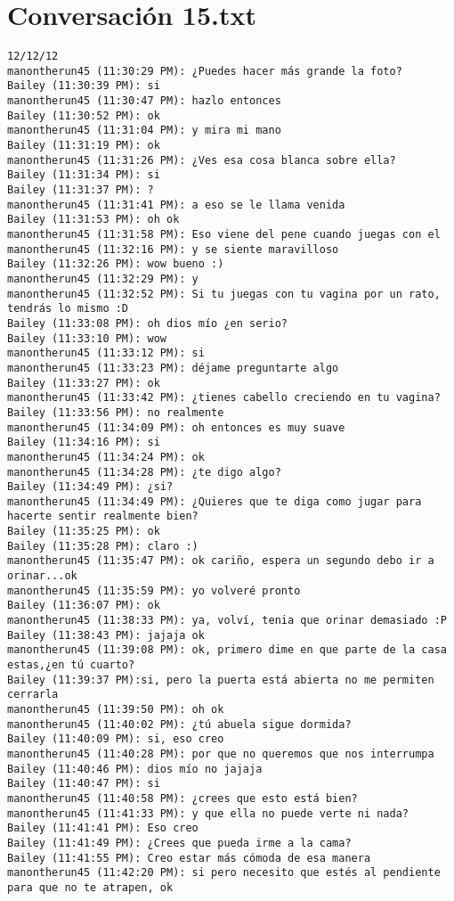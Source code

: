 \section{Conversaci\'on 15.txt}

\begin{verbatim}
12/12/12
manontherun45 (11:30:29 PM): ¿Puedes hacer más grande la foto?
Bailey (11:30:39 PM): si
manontherun45 (11:30:47 PM): hazlo entonces
Bailey (11:30:52 PM): ok
manontherun45 (11:31:04 PM): y mira mi mano
Bailey (11:31:19 PM): ok
manontherun45 (11:31:26 PM): ¿Ves esa cosa blanca sobre ella?
Bailey (11:31:34 PM): si
Bailey (11:31:37 PM): ?
manontherun45 (11:31:41 PM): a eso se le llama venida
Bailey (11:31:53 PM): oh ok
manontherun45 (11:31:58 PM): Eso viene del pene cuando juegas con el
manontherun45 (11:32:16 PM): y se siente maravilloso
Bailey (11:32:26 PM): wow bueno :)
manontherun45 (11:32:29 PM): y
manontherun45 (11:32:52 PM): Si tu juegas con tu vagina por un rato, tendrás lo mismo :D
Bailey (11:33:08 PM): oh dios mío ¿en serio?
Bailey (11:33:10 PM): wow
manontherun45 (11:33:12 PM): si
manontherun45 (11:33:23 PM): déjame preguntarte algo
Bailey (11:33:27 PM): ok
manontherun45 (11:33:42 PM): ¿tienes cabello creciendo en tu vagina?
Bailey (11:33:56 PM): no realmente
manontherun45 (11:34:09 PM): oh entonces es muy suave
Bailey (11:34:16 PM): si
manontherun45 (11:34:24 PM): ok
manontherun45 (11:34:28 PM): ¿te digo algo?
Bailey (11:34:49 PM): ¿si?
manontherun45 (11:34:49 PM): ¿Quieres que te diga como jugar para hacerte sentir realmente bien?
Bailey (11:35:25 PM): ok
Bailey (11:35:28 PM): claro :)
manontherun45 (11:35:47 PM): ok cariño, espera un segundo debo ir a orinar...ok
manontherun45 (11:35:59 PM): yo volveré pronto
Bailey (11:36:07 PM): ok
manontherun45 (11:38:33 PM): ya, volví, tenia que orinar demasiado :P
Bailey (11:38:43 PM): jajaja ok
manontherun45 (11:39:08 PM): ok, primero dime en que parte de la casa estas,¿en tú cuarto?
Bailey (11:39:37 PM):si, pero la puerta está abierta no me permiten cerrarla
manontherun45 (11:39:50 PM): oh ok
manontherun45 (11:40:02 PM): ¿tú abuela sigue dormida?
Bailey (11:40:09 PM): si, eso creo 
manontherun45 (11:40:28 PM): por que no queremos que nos interrumpa
Bailey (11:40:46 PM): dios mío no jajaja
Bailey (11:40:47 PM): si
manontherun45 (11:40:58 PM): ¿crees que esto está bien?
manontherun45 (11:41:33 PM): y que ella no puede verte ni nada?
Bailey (11:41:41 PM): Eso creo
Bailey (11:41:49 PM): ¿Crees que pueda irme a la cama?
Bailey (11:41:55 PM): Creo estar más cómoda de esa manera
manontherun45 (11:42:20 PM): si pero necesito que estés al pendiente para que no te atrapen, ok

\end{verbatim}
